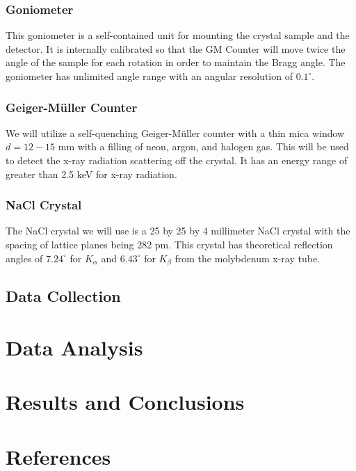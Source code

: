 \documentclass[]{article}
\begin{document}
		\subsubsection*{Goniometer}
			This goniometer is a self-contained unit for mounting the crystal sample and the detector. It is internally calibrated so that the GM Counter will move twice the angle of the sample for each rotation in order to maintain the Bragg angle. The goniometer has unlimited angle range with an angular resolution of $0.1^\circ$.
		\subsubsection*{Geiger-M\"uller Counter}
			We will utilize a self-quenching Geiger-M\"uller counter with a thin mica window $d = 12- 15$ mm with a filling of neon, argon, and halogen gas. This will be used to detect the x-ray radiation scattering off the crystal. It has an energy range of greater than 2.5 keV for x-ray radiation.
		\subsubsection*{NaCl Crystal}
			The NaCl crystal we will use is a 25 by 25 by 4 millimeter NaCl crystal with the spacing of lattice planes being 282 pm. This crystal has theoretical reflection angles of $7.24^\circ$ for $K_\alpha$ and $6.43^\circ$ for $K_\beta$ from the molybdenum x-ray tube.
		\subsection{Data Collection}
	
	\section{Data Analysis}
	
	\section{Results and Conclusions}
	
	\newpage
	\section*{References}
	
\end{document}
